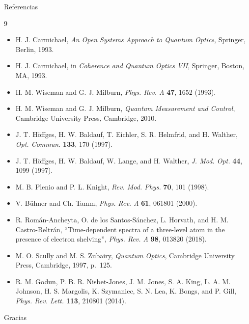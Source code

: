 \documentclass[aspectratio=169]{beamer}
\begin{document}
\begin{frame}[allowframebreaks]{Referencias}

\begin{thebibliography}{9}
\begin{itemize}
    \item H. J. Carmichael, \textit{An Open Systems Approach to Quantum Optics}, Springer, Berlin, 1993.

    \item H. J. Carmichael, in \textit{Coherence and Quantum Optics VII}, Springer, Boston, MA, 1993.

    \item H. M. Wiseman and G. J. Milburn, \textit{Phys. Rev. A} \textbf{47}, 1652 (1993).

    \item H. M. Wiseman and G. J. Milburn, \textit{Quantum Measurement and Control}, Cambridge University Press, Cambridge, 2010.

    \item J. T. Höffges, H. W. Baldauf, T. Eichler, S. R. Helmfrid, and H. Walther, \textit{Opt. Commun.} \textbf{133}, 170 (1997).

    \item J. T. Höffges, H. W. Baldauf, W. Lange, and H. Walther, \textit{J. Mod. Opt.} \textbf{44}, 1099 (1997).

    \item M. B. Plenio and P. L. Knight, \textit{Rev. Mod. Phys.} \textbf{70}, 101 (1998).

    \item V. Bühner and Ch. Tamm, \textit{Phys. Rev. A} \textbf{61}, 061801 (2000).

    \item R. Román-Ancheyta, O. de los Santos-Sánchez, L. Horvath, and H. M. Castro-Beltrán, ``Time-dependent spectra of a three-level atom in the presence of electron shelving'', \textit{Phys. Rev. A} \textbf{98}, 013820 (2018).

    \item M. O. Scully and M. S. Zubairy, \textit{Quantum Optics}, Cambridge University Press, Cambridge, 1997, p.~125.

    \item R. M. Godun, P. B. R. Nisbet-Jones, J. M. Jones, S. A. King, L. A. M. Johnson, H. S. Margolis, K. Szymaniec, S. N. Lea, K. Bongs, and P. Gill, \textit{Phys. Rev. Lett.} \textbf{113}, 210801 (2014).
\end{itemize}
\end{thebibliography}
\end{frame}

\begin{frame}
\centering
\Huge Gracias
\end{frame}
\end{document}
